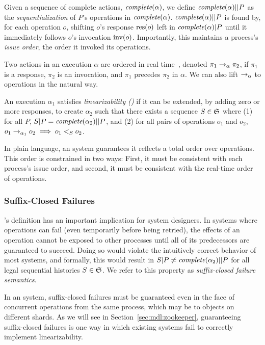 Given a sequence of complete actions,
$\operatorname*{\textit{complete}}(\alpha)$, we define $\operatorname*{\textit{complete}}(\alpha)||P$ as the
\textit{sequentialization} of $P$'s operations in $\operatorname*{\textit{complete}}(\alpha)$.
$\operatorname*{\textit{complete}}(\alpha)||P$ is found by, for each operation $o$, shifting $o$'s response
$\operatorname{res}(o)$ left in $\operatorname*{\textit{complete}}(\alpha)|P$ until it immediately follows $o$'s
invocation $\operatorname{inv}(o)$.
Importantly, this maintains a process's
\textit{issue order}, the order it invoked its operations.

Two actions in an execution $\alpha$ are
ordered in real time~\cite{herlihy1990linearizability}, denoted
$\pi_1 \rightarrow_\alpha \pi_2$, if $\pi_1$ is a response, $\pi_2$ is an
invocation, and $\pi_1$ precedes $\pi_2$ in $\alpha$.
We can also lift $\rightarrow_\alpha$ to operations in the natural
way.

 An execution $\alpha_1$ satisfies \textit{\multidispatch{} linearizability (\MDL{})} if it
can be extended, by adding zero or more responses, to create $\alpha_2$ such that
there exists a sequence $S \in \mathfrak{S}$ where (1) for all $P$,
$S|P = \operatorname*{\textit{complete}}(\alpha_2)||P$, and (2) for all pairs of operations
$o_1$ and $o_2$, $o_1 \rightarrow_{\alpha_1} o_2 \implies o_1 <_S o_2$.

In plain language, an \MDL{} system guarantees it reflects a total order 
over operations. This order is constrained in two ways: First,
it must be consistent with each process's issue order, and second, 
it must be consistent with the real-time order of operations.

\subsubsection{Suffix-Closed Failures}
\label{sec:mdl:def:failures}

\MDL{}'s definition has an important implication for system designers.
In systems where operations can fail (even temporarily before being retried), the
effects of an operation cannot be exposed to other processes until all of its 
predecessors are guaranteed to succeed. Doing so would violate the intuitively
correct behavior of most systems, and formally, this would result in
$S|P \neq \operatorname*{\textit{complete}}(\alpha_2)||P$ for all legal sequential histories
$S \in \mathfrak{S}$. We refer to this property as \textit{suffix-closed failure semantics}.

In an \MDL{} system, suffix-closed failures must be guaranteed even in the
face of concurrent operations from the same process, which may be to
objects on different shards. As we will see in Section~\ref{sec:mdl:zookeeper},
guaranteeing suffix-closed failures is one way in which existing systems fail
to correctly implement \multidispatch{} linearizability.  

